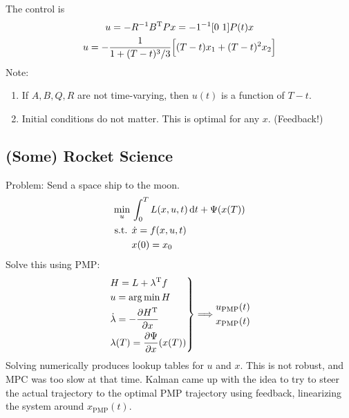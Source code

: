 The control is
\begin{gather}
  u = -R^{-1}B^\text{T} Px = -1^{-1} [0\ 1] P(t) x \\
  u = -\frac{1}{1+(T-t)^3/3} \Big[ (T-t)x_1 + (T-t)^2 x_2 \Big]
\end{gather}
Note:
\begin{enumerate}[nosep]
\item If $A,B,Q,R$ are not time-varying, then $u(t)$ is a function of $T-t$.
\item Initial conditions do not matter. This is optimal for any $x$. (Feedback!)
\end{enumerate}

\subsection{(Some) Rocket Science}
Problem: Send a space ship to the moon.
\begin{align}
  \min_u {} & \int_0^T L(x,u,t)\mathop{}\!\mathrm{d} t + \Psi(x(T)) \\
  \text{s.t. } & \dot x = f(x,u,t) \\
            & x(0) = x_0
\end{align}
Solve this using PMP:
\begin{gather}
  \left. \begin{aligned}
      & H = L + \lambda^\text{T} f \\
      & u = \arg\min H \\
      & \dot\lambda = -\frac{\partial H^\text{T}}{\partial x} \\
      & \lambda(T) = \frac{\partial \Psi}{\partial x}(x(T))
    \end{aligned} \right\} \Longrightarrow
  \begin{gathered}
    u_{\text{PMP}}(t) \\
    x_{\text{PMP}}(t)
  \end{gathered}
\end{gather}
Solving numerically produces lookup tables for $u$ and $x$. This is not robust, and MPC was too slow at that time. Kalman came up with the idea to try to steer the actual trajectory to the optimal PMP trajectory using feedback, linearizing the system around $x_{\text{PMP}}(t)$.

